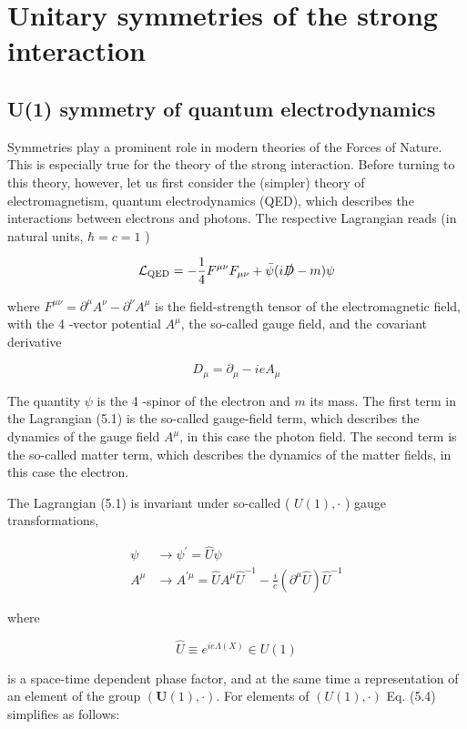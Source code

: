 \documentclass[10pt, letterpaper]{article}
\begin{document}
\section{Unitary symmetries of the strong interaction}




\subsection{U(1) symmetry of quantum electrodynamics}
Symmetries play a prominent role in modern theories of the Forces of Nature. This is especially true for the theory of the strong interaction. Before turning to this theory, however, let us first consider the (simpler) theory of electromagnetism, quantum electrodynamics (QED), which describes the interactions between electrons and photons. The respective Lagrangian reads (in natural units, $\hbar=c=1$ )

$$
\mathcal{L}_{\mathrm{QED}}=-\frac{1}{4} F^{\mu \nu} F_{\mu \nu}+\bar{\psi}(i \slashed{D}-m) \psi
$$

where $F^{\mu \nu}=\partial^{\mu} A^{\nu}-\partial^{\nu} A^{\mu}$ is the field-strength tensor of the electromagnetic field, with the 4 -vector potential $A^{\mu}$, the so-called gauge field, and the covariant derivative

$$
D_{\mu}=\partial_{\mu}-i e A_{\mu}
$$

The quantity $\psi$ is the 4 -spinor of the electron and $m$ its mass. The first term in the Lagrangian (5.1) is the so-called gauge-field term, which describes the dynamics of the gauge field $A^{\mu}$, in this case the photon field. The second term is the so-called matter term, which describes the dynamics of the matter fields, in this case the electron.

The Lagrangian (5.1) is invariant under so-called ( $U(1), \cdot$ ) gauge transformations,

$$
\begin{aligned}
\psi & \longrightarrow \psi^{\prime}=\hat{U} \psi \\
A^{\mu} & \longrightarrow A^{\prime \mu}=\hat{U} A^{\mu} \hat{U}^{-1}-\frac{i}{e}\left(\partial^{\mu} \hat{U}\right) \hat{U}^{-1}
\end{aligned}
$$

where

$$
\hat{U} \equiv e^{i e \Lambda(X)} \in U(1)
$$

is a space-time dependent phase factor, and at the same time a representation of an element of the group $(\boldsymbol{U}(1), \cdot)$. For elements of $(U(1), \cdot)$ Eq. (5.4) simplifies as follows:
\end{document}
